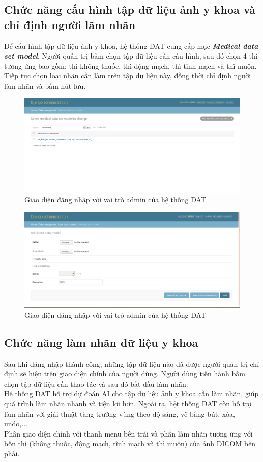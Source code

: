 \subsection{Chức năng cấu hình tập dữ liệu ảnh y khoa và chỉ định người lãm nhãn}
Để cấu hình tập dữ liệu ảnh y khoa, hệ thống DAT cung cấp mục \textbf{\textit{Medical data set model}}. Người quản trị bấm chọn tập dữ liệu cần cấu hình, sau đó chọn 4 thì tương ứng bao gồm: thì không thuốc, thì động mạch, thì tĩnh mạch và thì muộn. Tiếp tục chọn loại nhãn cần làm trên tập dữ liệu này, đồng thời chỉ định người làm nhãn và bấm nút lưu. 
\begin{figure}[H]
    \centering
    \includegraphics[width=14cm]{images/chapter-07-images/admin-medical-dataset-model-1.png}
    \caption{Giao diện đăng nhập với vai trò admin của hệ thống DAT}
\end{figure}
\begin{figure}[H]
    \centering
    \includegraphics[width=14cm]{images/chapter-07-images/admin-input-data-model-2.png}
    \caption{Giao diện đăng nhập với vai trò admin của hệ thống DAT}
\end{figure}


\subsection{Chức năng làm nhãn dữ liệu y khoa}
Sau khi đăng nhập thành công, những tập dữ liệu nào đã được người quản trị chỉ định sẽ hiện trên giao diện chính của người dùng. Người dùng tiến hành bấm chọn tập dữ liệu cần thao tác và sau đó  bắt đầu làm nhãn. \\
\indent Hệ thống DAT hỗ  trợ dự đoán AI cho tập dữ liệu ảnh y khoa cần làm nhãn, giúp quá trình làm nhãn nhanh và tiện lợi hơn. Ngoài ra, hệt thống DAT còn hỗ trợ làm nhãn với giải thuật tăng trưởng vùng theo độ sáng, vẽ bằng bút, xóa, undo,...\\
\indent Phân giao diện chính với thanh menu bên trái và phần làm nhãn tương ứng với bốn thì (không thuốc, động mạch, tĩnh mạch và thì muộn) của ảnh DICOM bên phải. 

